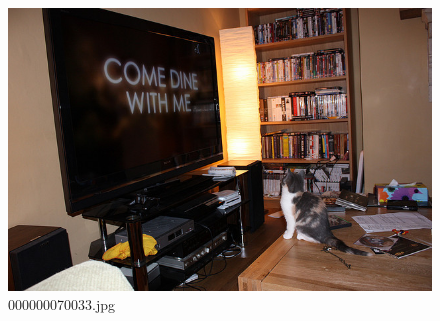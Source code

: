\begin{figure}[h]
    \centering
    \includegraphics[width=0.8\linewidth]{../image set/hard/000000070033.jpg}
    \caption{000000070033.jpg}
\end{figure}
